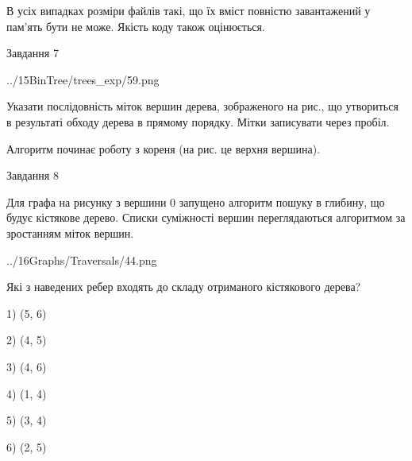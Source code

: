 \documentclass[12pt, ukrainian]{article}
\begin{document}
{В усіх випадках розміри файлів такі, що їх вміст повністю завантажений у пам'ять бути не може. Якість коду також оцінюється.



\vspace{10mm}\par

\newpage
\begin{minipage}[t]{9.7cm}
               
{\begin{center}Завдання {7}\end{center}}
\vspace{-4mm}

\begin{center}
	{../15BinTree/trees_exp/59.png}
\end{center}
Указати послідовність міток вершин дерева, зображеного на рис., що утвориться в результаті обходу дерева в прямому порядку. Мітки записувати через пробіл.\par Алгоритм починає роботу з кореня (на рис. це верхня вершина).\par

\end{minipage}
\vline \hspace{8mm}
\begin{minipage}[t]{8.0cm}
               
{\begin{center}Завдання {8}\end{center}}
\vspace{-4mm}
Для графа на рисунку з вершини 0 запущено алгоритм пошуку в глибину, що будує кістякове дерево. Списки суміжності вершин переглядаються алгоритмом за зростанням міток вершин.\par
\begin{center}
	{../16Graphs/Traversals/44.png}
\end{center}
\par Які з наведених ребер входять до складу отриманого кістякового дерева?\par
1) (5, 6)\par
2) (4, 5)\par
3) (4, 6)\par
4) (1, 4)\par
5) (3, 4)\par
6) (2, 5)\par
{\vskip 15pt} \par


\end{minipage}}
\end{document}
